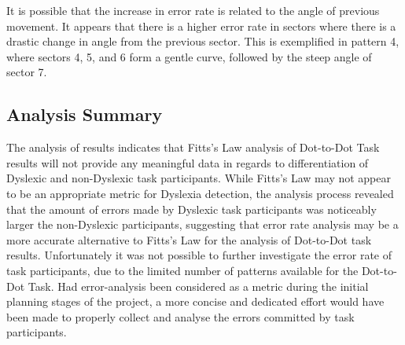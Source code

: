 		It is possible that the increase in error rate is related to the angle of previous movement. It appears that there is a higher error rate in sectors where there is a drastic change in angle from the previous sector. This is exemplified in pattern 4, where sectors 4, 5, and 6 form a gentle curve, followed by the steep angle of sector 7.
		
	\subsection{Analysis Summary}
		The analysis of results indicates that Fitts’s Law analysis of Dot-to-Dot Task results will not provide any meaningful data in regards to differentiation of Dyslexic and non-Dyslexic task participants. While Fitts’s Law may not appear to be an appropriate metric for Dyslexia detection, the analysis process revealed that the amount of errors made by Dyslexic task participants was noticeably larger the non-Dyslexic participants, suggesting that error rate analysis may be a more accurate alternative to Fitts’s Law for the analysis of Dot-to-Dot task results. Unfortunately it was not possible to further investigate the error rate of task participants, due to the limited number of patterns available for the Dot-to-Dot Task. Had error-analysis been considered as a metric during the initial planning stages of the project, a more concise and dedicated effort would have been made to properly collect and analyse the errors committed by task participants.	
\newpage
